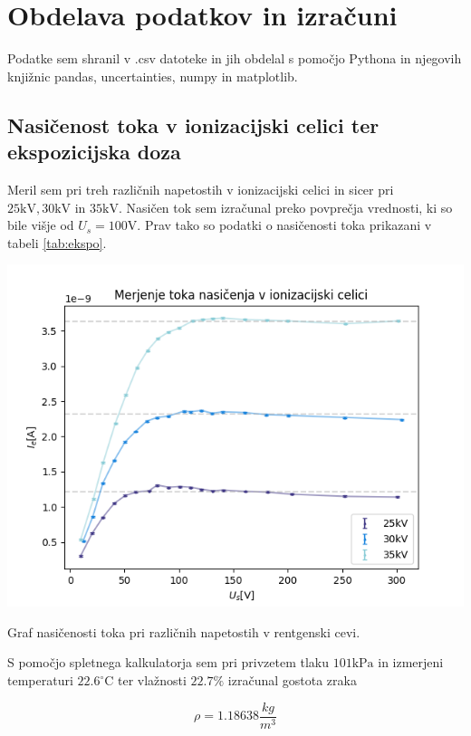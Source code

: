 \documentclass[11pt]{article}
\begin{document}
\section{Obdelava podatkov in izračuni}\label{sec:orgdf50172}

Podatke sem shranil v .csv datoteke in jih obdelal s pomočjo Pythona in njegovih knjižnic pandas, uncertainties, numpy in matplotlib.

\subsection{Nasičenost toka v ionizacijski celici ter ekspozicijska doza}\label{sec:org5aad74f}

Meril sem pri treh različnih napetostih v ionizacijski celici in sicer pri \(25 \mathrm{kV}, 30 \mathrm{kV} \text{ in } 35 \mathrm{kV}\). Nasičen tok sem izračunal preko povprečja vrednosti, ki so bile višje od \(U_s = 100 \mathrm{V}\). Prav tako so podatki o nasičenosti toka prikazani v tabeli \ref{tab:ekspo}.

\begin{slika}[H]
\begin{center}
\includegraphics[width=.9\linewidth]{figures/tok_nasicenja.png}
\end{center}
\caption{\small Graf nasičenosti toka pri različnih napetostih v rentgenski cevi.}\label{fig:nasicenost}
\end{slika}
S pomočjo spletnega kalkulatorja \cite{noauthor_air_nodate} sem pri privzetem tlaku \(101 \mathrm{kPa}\) in izmerjeni temperaturi \(22.6 ^{\circ} \mathrm{C}\) ter vlažnosti \(22.7 \%\) izračunal gostota zraka

\[ \rho = 1.18638 \frac{kg}{m ^3}
\]
\end{document}
